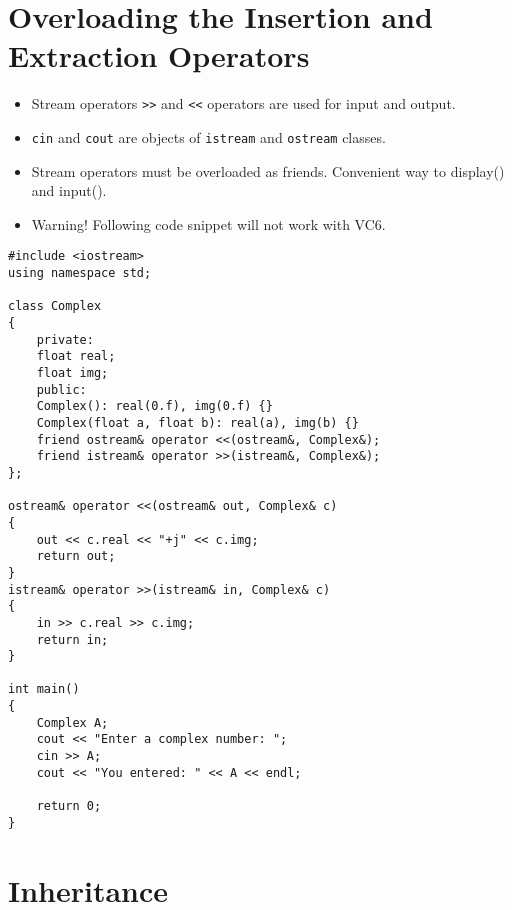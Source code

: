 \documentclass[12pt,a4paper]{article}
\begin{document}
\section{Overloading the Insertion and Extraction Operators}
\begin{itemize}
\item Stream operators \verb|>>| and \verb|<<| operators are used for input and output.
\item \verb|cin| and \verb|cout| are objects of \verb|istream| and \verb|ostream| classes.
\item Stream operators must be overloaded as friends. Convenient way to display() and input().
\item Warning! Following code snippet will not work with VC6.
\end{itemize}
\begin{lstlisting}[caption={Overloading Stream Operators for Complex class}]
#include <iostream>
using namespace std;

class Complex
{
	private:
	float real;
	float img;
	public:
	Complex(): real(0.f), img(0.f) {}
	Complex(float a, float b): real(a), img(b) {}
	friend ostream& operator <<(ostream&, Complex&);
	friend istream& operator >>(istream&, Complex&);
};

ostream& operator <<(ostream& out, Complex& c)
{
	out << c.real << "+j" << c.img;
	return out;
}
istream& operator >>(istream& in, Complex& c)
{
	in >> c.real >> c.img;
	return in;
}

int main()
{
	Complex A;
	cout << "Enter a complex number: ";
	cin >> A;
	cout << "You entered: " << A << endl;

	return 0;
}
\end{lstlisting}
\section{Inheritance}


\end{document}
